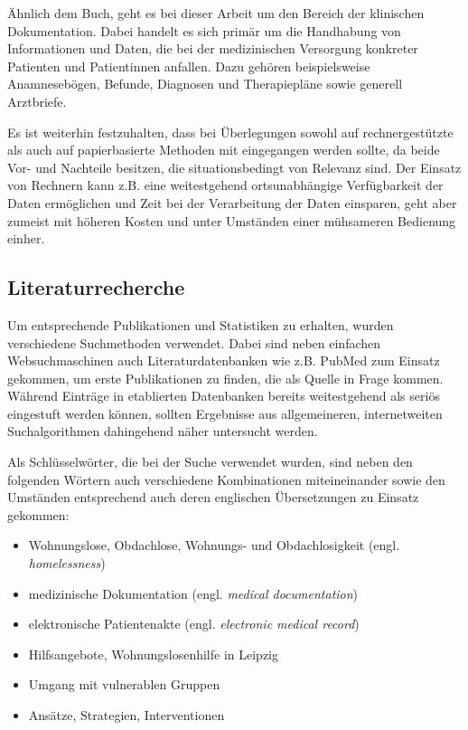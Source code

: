 Ähnlich dem Buch, geht es bei dieser Arbeit um den Bereich der klinischen Dokumentation. Dabei handelt es sich primär um die Handhabung von Informationen und Daten, die bei der medizinischen Versorgung konkreter Patienten und Patientinnen anfallen. Dazu gehören beispielsweise Anamnesebögen, Befunde, Diagnosen und Therapiepläne sowie generell Arztbriefe.

Es ist weiterhin festzuhalten, dass bei Überlegungen sowohl auf rechnergestützte als auch auf papierbasierte Methoden mit eingegangen werden sollte, da beide Vor- und Nachteile besitzen, die situationsbedingt von Relevanz sind. Der Einsatz von Rechnern kann z.B. eine weitestgehend ortsunabhängige Verfügbarkeit der Daten ermöglichen und Zeit bei der Verarbeitung der Daten einsparen, geht aber zumeist mit höheren Kosten und unter Umständen einer mühsameren Bedienung einher.


\subsection{Literaturrecherche}

Um entsprechende Publikationen und Statistiken zu erhalten, wurden verschiedene Suchmethoden verwendet. Dabei sind neben einfachen Websuchmaschinen auch Literaturdatenbanken wie z.B. PubMed zum Einsatz gekommen, um erste Publikationen zu finden, die als Quelle in Frage kommen. Während Einträge in etablierten Datenbanken bereits weitestgehend als seriös eingestuft werden können, sollten Ergebnisse aus allgemeineren, internetweiten Suchalgorithmen dahingehend näher untersucht werden.

Als Schlüsselwörter, die bei der Suche verwendet wurden, sind neben den folgenden Wörtern auch verschiedene Kombinationen miteineinander sowie den Umständen entsprechend auch deren englischen Übersetzungen zu Einsatz gekommen:

\begin{itemize}
	\item Wohnungslose, Obdachlose, Wohnungs- und Obdachlosigkeit (engl. \textit{homelessness})
	\item medizinische Dokumentation (engl. \textit{medical documentation})
	\item elektronische Patientenakte (engl. \textit{electronic medical record})
	\item Hilfsangebote, Wohnungslosenhilfe in Leipzig
	\item Umgang mit vulnerablen Gruppen
	\item Ansätze, Strategien, Interventionen
\end{itemize}

